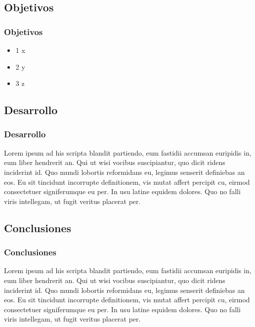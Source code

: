 \documentclass{beamer}
\begin{document}
\subsection{Objetivos}
\begin{frame}
\frametitle{Objetivos}
	\begin{itemize}
		\item 1 x
		\item 2 y
		\item 3 z
	\end{itemize}




\end{frame}


\subsection{Desarrollo}
\begin{frame}
\frametitle{Desarrollo}
Lorem ipsum ad his scripta blandit partiendo, eum fastidii accumsan euripidis in, eum liber hendrerit an. Qui ut wisi vocibus suscipiantur, quo dicit ridens inciderint id. Quo mundi lobortis reformidans eu, legimus senserit definiebas an eos. Eu sit tincidunt incorrupte definitionem, vis mutat affert percipit cu, eirmod consectetuer signiferumque eu per. In usu latine equidem dolores. Quo no falli viris intellegam, ut fugit veritus placerat per.
\end{frame}


\subsection{Conclusiones}
\begin{frame}
\frametitle{Conclusiones}
Lorem ipsum ad his scripta blandit partiendo, eum fastidii accumsan euripidis in, eum liber hendrerit an. Qui ut wisi vocibus suscipiantur, quo dicit ridens inciderint id. Quo mundi lobortis reformidans eu, legimus senserit definiebas an eos. Eu sit tincidunt incorrupte definitionem, vis mutat affert percipit cu, eirmod consectetuer signiferumque eu per. In usu latine equidem dolores. Quo no falli viris intellegam, ut fugit veritus placerat per.
\end{frame}
\end{document}
